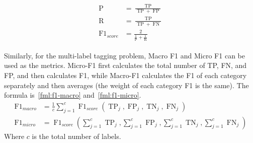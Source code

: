 \begin{align}\label{fml:f1score}
	\begin{split}
		\operatorname{P}          & =\frac{\operatorname{TP}}{\operatorname{TP}+\operatorname{FP}}    \\
		\operatorname{R}          & =\frac{\operatorname{TP}}{\operatorname{TP}+\operatorname{FN}}    \\
		\operatorname{F1}_{score} & = \frac{2}{\frac{1}{\operatorname{P}}+\frac{1}{\operatorname{R}}}
	\end{split}
\end{align}


Similarly, for the multi-label tagging problem, Macro F1 and Micro F1 can be used as the metrics. Micro-F1 first calculates the total number of TP, FN, and FP, and then calculates F1, while Macro-F1 calculates the F1 of each category separately and then averages (the weight of each category F1 is the same). The formula is~\ref{fml:f1-macro} and~\ref{fml:f1-micro}.
\begin{align}
	\operatorname{F1}_{macro} & =\frac{1}{c} \sum_{j=1}^{c} \operatorname{F1}_{score}(\operatorname{TP}_{j}, \operatorname{FP}_{j}, \operatorname{TN}_{j}, \operatorname{FN}_{j}) \label{fml:f1-macro}                                  \\
	\operatorname{F1}_{micro} & =\operatorname{F1}_{score}(\sum_{j=1}^{c} \operatorname{TP}_{j}, \sum_{j=1}^{c} \operatorname{FP}_{j}, \sum_{j=1}^{c} \operatorname{TN}_{j}, \sum_{j=1}^{c} \operatorname{FN}_{j}) \label{fml:f1-micro}
\end{align}
Where \(c\) is the total number of labels.

